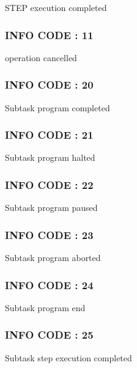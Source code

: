 S\-T\-E\-P execution completed



 \subsubsection*{I\-N\-F\-O C\-O\-D\-E \-: 11 }

operation cancelled



 \subsubsection*{I\-N\-F\-O C\-O\-D\-E \-: 20 }

Subtask program completed



 \subsubsection*{I\-N\-F\-O C\-O\-D\-E \-: 21 }

Subtask program halted



 \subsubsection*{I\-N\-F\-O C\-O\-D\-E \-: 22 }

Subtask program paused



 \subsubsection*{I\-N\-F\-O C\-O\-D\-E \-: 23 }

Subtask program aborted



 \subsubsection*{I\-N\-F\-O C\-O\-D\-E \-: 24 }

Subtask program end



 \subsubsection*{I\-N\-F\-O C\-O\-D\-E \-: 25 }

Subtask step execution completed



